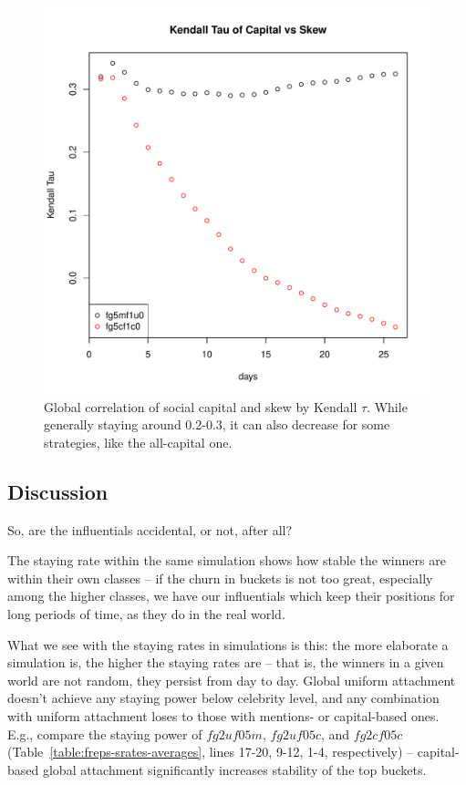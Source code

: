 \documentclass[10pt,oneside]{memoir}
\begin{document}
\begin{figure}
\begin{center}
    \includegraphics{figures/kendall-tau-fg5mf1u0-fg5cf1c0}
    \caption{Global correlation of social capital and skew by Kendall $\tau$.  While generally staying around 0.2-0.3, it can also decrease for some strategies, like the all-capital one.}
    \label{figure:kendall-tau-fg5mf1u0-fg5cf1c0}
\end{center}
\end{figure}
\pagebreak \subsection{Discussion}
\label{discussion}

\label{sec:simulation-results}
So, are the influentials accidental, or not, after all?


The staying rate within the same simulation shows how stable the winners are within their own classes -- if the churn in buckets is not too great, especially among the higher classes, we have our influentials which keep their positions for long periods of time, as they do in the real world.


What we see with the staying rates in simulations is this: the more elaborate a simulation is, the higher the staying rates are -- that is, the winners in a given world are not random, they persist from day to day.  Global uniform attachment doesn't achieve any staying power below celebrity level, and any combination with uniform attachment loses to those with mentions- or capital-based ones.  E.g., compare the staying power of $fg2uf05m$, $fg2uf05c$, and $fg2cf05c$ (Table~\ref{table:freps-srates-averages}, lines 17-20, 9-12, 1-4, respectively) -- capital-based global attachment significantly increases stability of the top buckets.
\end{document}
